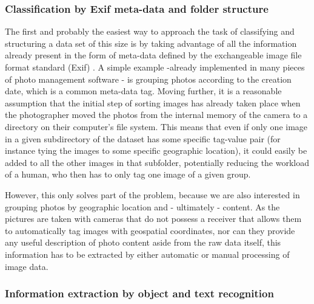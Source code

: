 \documentclass [12pt,a4paper]{report}
\begin{document}
\subsubsection{Classification by Exif meta-data and folder structure}

The first and probably the easiest way to approach the task of classifying and structuring a data set of this size is by taking advantage of all the information already present in the form of meta-data defined by the exchangeable image file format standard (Exif) \cite{japan2002jeita}. A simple example -already implemented in many pieces of photo management software - is grouping photos according to the creation date, which is a common meta-data tag. Moving further, it is a reasonable assumption that the initial step of sorting images has already taken place when the photographer moved the photos from the internal memory of the camera to a directory on their computer's file system. This means that even if only one image in a given subdirectory of the dataset has some specific tag-value pair (for instance tying the images to some specific geographic location), it could easily be added to all the other images in that subfolder, potentially reducing the workload of a human, who then has to only tag one image of a given group.

However, this only solves part of the problem, because we are also interested in grouping photos by geographic location and - ultimately - content. As the pictures are taken with cameras that do not possess a receiver that allows them to automatically tag images with geospatial coordinates, nor can they provide any useful description of photo content aside from the raw data itself, this information has to be extracted by either automatic or manual processing of image data. 

\subsubsection{Information extraction by object and text recognition}
\end{document}
